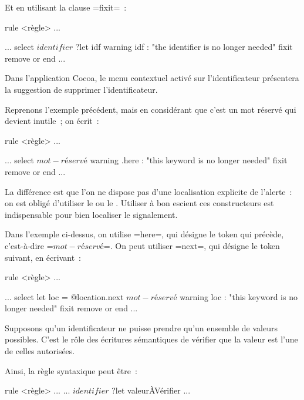 Et en utilisant la clause \ggsq=fixit=~:

\begin{galgas4}
rule <règle> ... {
  ...
  select
    $identifier$ ?let idf
    warning idf : "the identifier is no longer needed" fixit { remove }
  or
  end
  ...

}
\end{galgas4}

Dans l'application Cocoa, le menu contextuel activé sur l'identificateur présentera la suggestion de supprimer l'identificateur.



Reprenons l'exemple précédent, mais en considérant que c'est un mot réservé qui devient inutile~; on écrit~:

\begin{galgas4}
rule <règle> ... {
  ...
  select
    $mot-réservé$
    warning .here : "this keyword is no longer needed" fixit { remove }
  or
  end
  ...

}
\end{galgas4}

La différence est que l'on ne dispose pas d'une localisation explicite de l'alerte~: on est obligé d'utiliser le  ou le . Utiliser à bon escient ces constructeurs est indispensable pour bien localiser le signalement.

Dans l'exemple ci-dessus, on utilise \ggsq=here=, qui désigne le token qui précède, c'est-à-dire \ggsq=$mot-réservé$=. On peut utiliser \ggsq=next=, qui désigne le token suivant, en écrivant~:

\begin{galgas4}
rule <règle> ... {
  ...
  select
    let loc = @location.next
    $mot-réservé$
    warning loc : "this keyword is no longer needed" fixit { remove }
  or
  end
  ...

}
\end{galgas4}



Supposons qu'un identificateur ne puisse prendre qu'un ensemble de valeurs possibles. C'est le rôle des écritures sémantiques de vérifier que la valeur est l'une de celles autorisées.

Ainsi, la règle syntaxique peut être~:
\begin{galgas4}
rule <règle> ... {
  ...
  $identifier$ ?let valeurÀVérifier
  ...
}
\end{galgas4}

